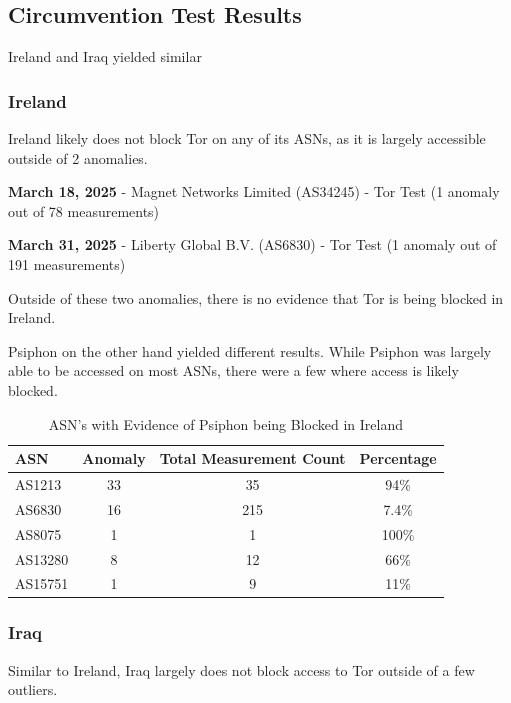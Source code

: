 \subsection{Circumvention Test Results}

Ireland and Iraq yielded similar 

\subsubsection{Ireland}

Ireland likely does not block Tor on any of its ASNs, as it is largely accessible outside of 2 anomalies.

\textbf{March 18, 2025} - Magnet Networks Limited (AS34245) - Tor Test (1 anomaly out of 78 measurements)

\textbf{March 31, 2025} - Liberty Global B.V. (AS6830) - Tor Test (1 anomaly out of 191 measurements)

Outside of these two anomalies, there is no evidence that Tor is being blocked in Ireland.

Psiphon on the other hand yielded different results. While Psiphon was largely able to be accessed on most ASNs, there were a few where access is likely blocked. 

\begin{table}[H]
\centering
\caption{ASN's with Evidence of Psiphon being Blocked in Ireland}
\begin{tabular}{lccc}
\toprule
\textbf{ASN} & \textbf{Anomaly} & \textbf{Total Measurement Count} & \textbf{Percentage} \\
\midrule
AS1213    & 33 & 35  & 94\% \\
AS6830    & 16 & 215 & 7.4\% \\
AS8075    & 1  & 1   & 100\% \\
AS13280   & 8  & 12  & 66\% \\
AS15751   & 1  & 9   & 11\% \\
\bottomrule
\end{tabular}
\label{tab:category_block}
\end{table}

\subsubsection{Iraq}

Similar to Ireland, Iraq largely does not block access to Tor outside of a few outliers.

